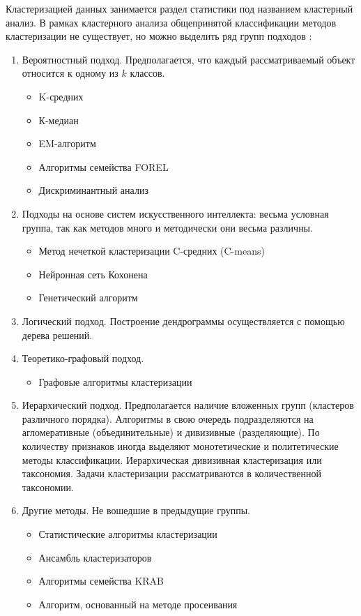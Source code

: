 Кластеризацией данных занимается раздел статистики под названием кластерный анализ. В рамках кластерного анализа общепринятой классификации методов кластеризации не существует, но можно выделить ряд групп подходов \cite{wiki-clustering}:

\begin{enumerate}
	\item Вероятностный подход. Предполагается, что каждый рассматриваемый объект относится к одному из $k$ классов.
	\begin{itemize}
		\item K-средних
		\item К-медиан
		\item EM-алгоритм
		\item Алгоритмы семейства FOREL
		\item Дискриминантный анализ
	\end{itemize}
	\item Подходы на основе систем искусственного интеллекта: весьма условная группа, так как методов много и методически они весьма различны.
	\begin{itemize}
		\item Метод нечеткой кластеризации C-средних (C-means)
		\item Нейронная сеть Кохонена
		\item Генетический алгоритм
	\end{itemize}
	\item Логический подход. Построение дендрограммы осуществляется с помощью дерева решений.
	\item Теоретико-графовый подход.
	\begin{itemize}
		\item Графовые алгоритмы кластеризации
	\end{itemize}
	\item Иерархический подход. Предполагается наличие вложенных групп (кластеров различного порядка). Алгоритмы в свою очередь подразделяются на агломеративные (объединительные) и дивизивные (разделяющие). По количеству признаков иногда выделяют монотетические и политетические методы классификации.
	Иерархическая дивизивная кластеризация или таксономия. Задачи кластеризации рассматриваются в количественной таксономии.
	\item Другие методы. Не вошедшие в предыдущие группы.
	\begin{itemize}
		\item Статистические алгоритмы кластеризации
		\item Ансамбль кластеризаторов
		\item Алгоритмы семейства KRAB
		\item Алгоритм, основанный на методе просеивания
	\end{itemize}
\end{enumerate}

